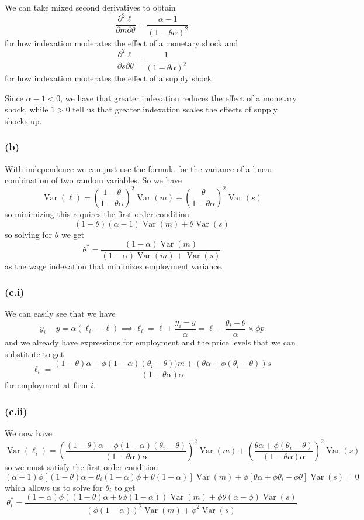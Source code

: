 \documentclass[11pt]{amsart}
\begin{document}
We can take mixed second derivatives to obtain
\[
\frac{\partial^2 \ell}{\partial m \partial \theta} = \frac{\alpha - 1}{(1-\theta \alpha)^2}
\]
for how indexation moderates the effect of a monetary shock and
\[
\frac{\partial^2 \ell}{\partial s \partial \theta} = \frac{1}{(1-\theta \alpha)^2}
\]
for how indexation moderates the effect of a supply shock.

Since $\alpha - 1 < 0$, we have that greater indexation reduces the effect of a monetary shock, while $1 > 0$ tell us that greater indexation scales the effects of supply shocks up.

\subsubsection*{(b)}

With independence we can just use the formula for the variance of a linear combination of two random variables. So we have
\[
\operatorname{Var}(\ell) = \left(\frac{1-\theta}{1-\theta \alpha}\right)^2 \operatorname{Var}(m) + \left(\frac{\theta}{1-\theta \alpha}\right)^2 \operatorname{Var}(s)
\]
so minimizing this requires the first order condition
\[
(1-\theta)(\alpha-1) \operatorname{Var}(m) + \theta \operatorname{Var}(s)
\]
so solving for $\theta$ we get
\[
\theta^* = \frac{(1-\alpha) \operatorname{Var}(m)}{(1-\alpha) \operatorname{Var}(m) + \operatorname{Var}(s)}
\]
as the wage indexation that minimizes employment variance.

\subsubsection*{(c.i)}

We can easily see that we have
\[
y_i - y = \alpha (\ell_i - \ell) \implies \ell_i = \ell + \frac{y_i - y}{\alpha} = \ell - \frac{\theta_i - \theta}{\alpha} \times \phi p
\]
and we already have expressions for employment and the price levels that we can substitute to get
\[
\ell_i = \frac{(1-\theta) \alpha - \phi (1-\alpha) (\theta_i - \theta)) m + (\theta \alpha + \phi (\theta_i - \theta)) s}{(1-\theta \alpha) \alpha}
\]
for employment at firm $i$.

\subsubsection*{(c.ii)}

We now have
\[
\operatorname{Var}(\ell_i) = \left(\frac{(1-\theta) \alpha - \phi (1-\alpha) (\theta_i - \theta)}{(1-\theta \alpha) \alpha}\right)^2 \operatorname{Var}(m) + \left(\frac{\theta \alpha + \phi (\theta_i - \theta)}{(1-\theta \alpha) \alpha}\right)^2 \operatorname{Var}(s)
\]
so we must satisfy the first order condition
\[
(\alpha - 1) \phi [(1-\theta) \alpha - \theta_i (1-\alpha) \phi + \theta (1-\alpha)] \operatorname{Var}(m) + \phi[\theta \alpha + \phi \theta_i - \phi \theta] \operatorname{Var}(s) = 0
\]
which allows us to solve for $\theta_i$ to get
\[
\theta_i^* = \frac{(1-\alpha) \phi ((1-\theta)\alpha + \theta \phi (1-\alpha)) \operatorname{Var}(m) + \phi \theta(\alpha - \phi) \operatorname{Var}(s)}{(\phi(1-\alpha))^2 \operatorname{Var}(m) + \phi^2 \operatorname{Var}(s)}
\]
\end{document}
